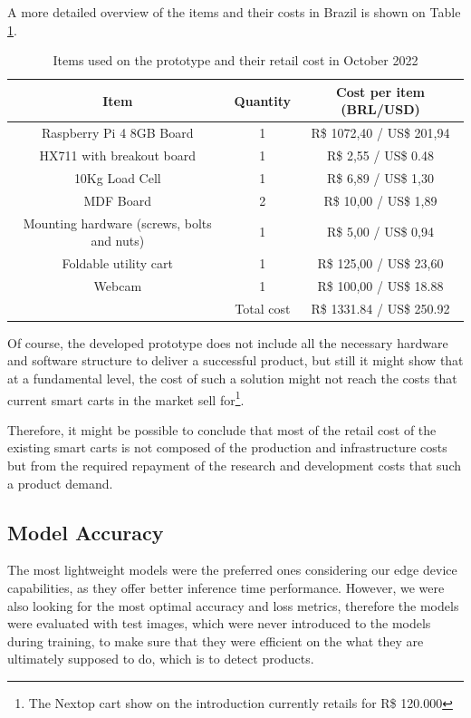 \documentclass[openright]{normas-utf-tex} %
\begin{document}
A more detailed overview of the items and their costs in Brazil is shown on Table \ref{tbl:cost}.

\begin{table}[H]
	\centering
	\label{tab:correlacao}
	\begin{tabular}{c c c}
		\hline 
        Item & Quantity & Cost per item (BRL/USD) \\
		\hline
        Raspberry Pi 4 8GB Board &  1 & R\$ 1072,40 / US\$ 201,94 \\
        HX711 with breakout board &  1  & R\$ 2,55 / US\$ 0.48 \\
        10Kg Load Cell & 1 & R\$ 6,89 / US\$ 1,30 \\
        MDF Board &  2  & R\$ 10,00 / US\$ 1,89 \\
        Mounting hardware (screws, bolts and nuts) &  1  & R\$ 5,00 / US\$ 0,94 \\
        Foldable utility cart &  1  & R\$ 125,00 / US\$ 23,60 \\
        Webcam &  1  & R\$ 100,00 / US\$ 18.88 \\
		\hline 
        & Total cost & R\$ 1331.84 / US\$ 250.92 \\
        \hline
	\end{tabular}
    \caption[Items used on the prototype and their approximate retail cost in Brazil as of October 2022]{Items used on the prototype and their retail cost in October 2022}
    \label{tbl:cost}
\end{table}

Of course, the developed prototype does not include all the necessary hardware
and software structure to deliver a successful product, but still it might show that at a
fundamental level, the cost of such a solution might not reach the costs that
current smart carts in the market sell for\footnote{The Nextop cart show on the
introduction currently retails for R\$ 120.000}.

Therefore, it might be possible to conclude that most of the retail cost of the
existing smart carts is not composed of the production and infrastructure costs
but from the required repayment of the research and development costs that such
a product demand.

\subsection{Model Accuracy}

The most lightweight models were the preferred ones considering our edge device capabilities,
as they offer better inference time performance. 
However, we were also looking for the most optimal accuracy and loss metrics, 
therefore the models were evaluated with test images, which were never introduced to the models
during training, to make sure that they were efficient on the what they are ultimately supposed to do, 
which is to detect products.
\end{document}
